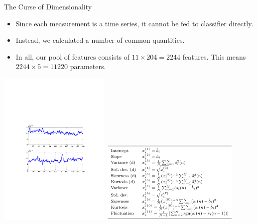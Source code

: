 \documentclass[10pt, aspectratio=169]{beamer} %
\begin{document}
\begin{frame}
{The Curse of Dimensionality}
\begin{itemize}
\item Since each measurement is a time series, it cannot be fed to classifier directly.
\item Instead, we calculated a number of common quantities.
\item In all, our pool of features consists of $11\times 204 = 2244$ features. This means $2244\times 5 = 11220$ parameters.
\end{itemize}
\centerline{\includegraphics[width=0.4\textwidth]{MEGData.pdf} \qquad \includegraphics[width=0.5\textwidth]{MEG_Features.png}}
\end{frame}

\end{document}
